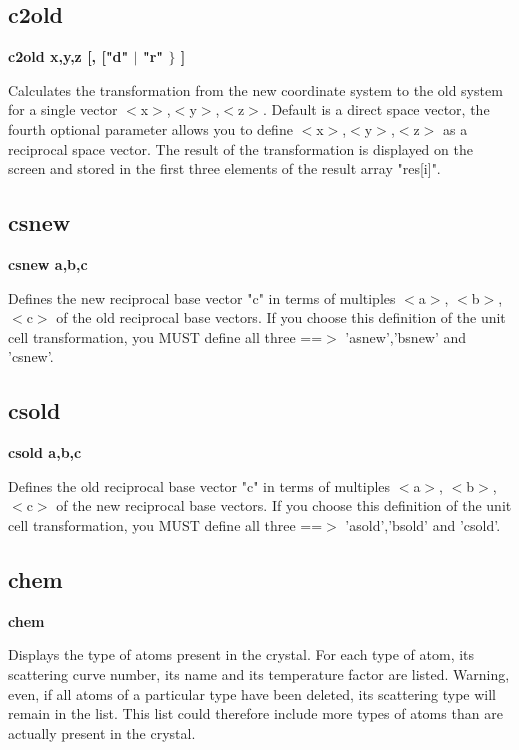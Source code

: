 \subsection*{c2old}
{\bf c2old x,y,z [, ["d" $| $ "r" $\} $ ] \par }
\vspace{3pt}
Calculates the transformation from the new coordinate system to the old 
system for a single vector $ <$x$> $,$ <$y$> $,$ <$z$> $. Default is a direct space vector, 
the fourth optional parameter allows you to define $ <$x$> $,$ <$y$> $,$ <$z$> $ as a 
reciprocal space vector. The result of the transformation is displayed 
on the screen and stored in the first three elements of the result array 
"res[i]". 
\subsection*{csnew}
{\bf csnew a,b,c \par }
\par
\vspace{3pt}
Defines the new reciprocal base vector "c" in terms of 
multiples $ <$a$> $, $ <$b$> $, $ <$c$> $ of the old reciprocal base vectors. 
If you choose this definition of the unit cell transformation, you MUST 
define all three ==$> $ 'asnew','bsnew' and 'csnew'. 
\subsection*{csold}
{\bf csold a,b,c \par }
\par
\vspace{3pt}
Defines the old reciprocal base vector "c" in terms of 
multiples $ <$a$> $, $ <$b$> $, $ <$c$> $ of the new reciprocal base vectors. 
If you choose this definition of the unit cell transformation, you MUST 
define all three ==$> $ 'asold','bsold' and 'csold'. 
\subsection*{chem}
{\bf chem \par }
\par
\vspace{3pt}
Displays the type of atoms present in the crystal. For each type of 
atom, its scattering curve number, its name and its temperature 
factor are listed. 
Warning, even, if all atoms of a particular type have been deleted, its 
scattering type will remain in the list. This list could therefore 
include more types of atoms than are actually present in the crystal. 
